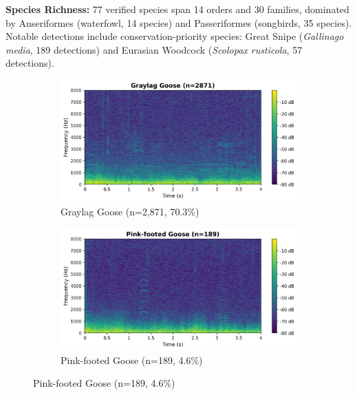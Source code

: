 \documentclass[twocolumn]{article}
\begin{document}
\textbf{Species Richness:} 77 verified species span 14 orders and 30 families, dominated by Anseriformes (waterfowl, 14 species) and Passeriformes (songbirds, 35 species). Notable detections include conservation-priority species: Great Snipe (\textit{Gallinago media}, 189 detections) and Eurasian Woodcock (\textit{Scolopax rusticola}, 57 detections).

\begin{figure}[t]
\centering
\begin{subfigure}{0.48\textwidth}
\includegraphics[width=\textwidth]{figures/spectrogram_graylag_goose.png}
\caption{Graylag Goose (n=2,871, 70.3\%)}
\end{subfigure}
\hfill
\begin{subfigure}{0.48\textwidth}
\includegraphics[width=\textwidth]{figures/spectrogram_pink-footed_goose.png}
\caption{Pink-footed Goose (n=189, 4.6\%)}
\end{subfigure}


\end{figure}
\end{document}
